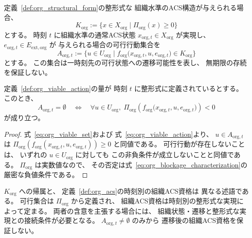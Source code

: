 \begin{definition}[組織水準の可行集合と可行行動集合]
\label{def:org_viable_action}
定義~\ref{def:org_structural_form}の整形式な
組織水準のACS構造が与えられる場合、
\begin{equation}
  K_{\mathrm{org}}
  :=\{x\in X_{\mathrm{org}}\mid
  \Pi_{\mathrm{org}}(x)\geq0\}
  \label{eq:org_viable_set}
\end{equation}
とする。
時刻 $t$ に組織水準の通常ACS状態
$x_{\mathrm{org},t}\in X_{\mathrm{org}}$ が実現し、
$e_{\mathrm{org},t}\in E_{\mathrm{ext},\mathrm{org}}$ が
与えられる場合の可行行動集合を
\begin{equation}
  A_{\mathrm{org},t}
  :=\bigl\{u\in U_{\mathrm{org}}\mid
  f_{\mathrm{org}}\bigl(x_{\mathrm{org},t},u,
  e_{\mathrm{org},t}\bigr)\in K_{\mathrm{org}}\bigr\}
  \label{eq:org_viable_action}
\end{equation}
とする。
この集合は一時刻先の可行状態への遷移可能性を表し、
無期限の存続を保証しない。
\end{definition}

\begin{proposition}[組織水準の閉塞の特徴づけ]
\label{prop:org_blockage_characterization}
定義~\ref{def:org_viable_action}の量が
時刻 $t$ に整形式に定義されているとする。
このとき、
\begin{equation}
  A_{\mathrm{org},t}=\emptyset
  \quad\Longleftrightarrow\quad
  \forall u\in U_{\mathrm{org}},\;
  \Pi_{\mathrm{org}}\!\left(
  f_{\mathrm{org}}\bigl(x_{\mathrm{org},t},u,
  e_{\mathrm{org},t}\bigr)\right)<0
  \label{eq:org_blockage_characterization}
\end{equation}
が成り立つ。
\end{proposition}

\begin{proof}
式~\eqref{eq:org_viable_set}および
式~\eqref{eq:org_viable_action}より、
$u\in A_{\mathrm{org},t}$ は
$\Pi_{\mathrm{org}}(f_{\mathrm{org}}(
 x_{\mathrm{org},t},u,e_{\mathrm{org},t}))\geq0$
と同値である。
可行行動が存在しないことは、
いずれの $u\in U_{\mathrm{org}}$ に対しても
この非負条件が成立しないことと同値である。
$\Pi_{\mathrm{org}}$ は実数値なので、
その否定は式~\eqref{eq:org_blockage_characterization}の
厳密な負値条件である。
\end{proof}

\begin{remark}[可行性と組織ACS資格]
\label{rem:org_viability_vs_qualification}
$K_{\mathrm{org}}$ への帰属と、
定義~\ref{def:org_acs}の時刻別の組織ACS資格は
異なる述語である。
可行集合は $\Pi_{\mathrm{org}}$ から定義され、
組織ACS資格は時刻別の整形式な実現によって定まる。
両者の含意を主張する場合には、
組織状態・遷移と整形式な実現との接続条件が必要となる。
$A_{\mathrm{org},t}\neq\emptyset$ のみから
遷移後の組織ACS資格を保証しない。
\end{remark}

